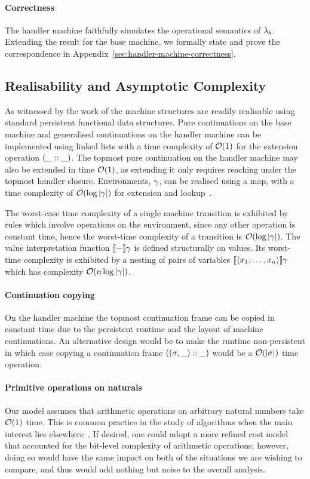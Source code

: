\documentclass[12pt,phd,lfcs,twoside,openright,logo,leftchapter,normalheadings]{infthesis}
\theoremstyle{plain}
\theoremstyle{definition}
\begin{document}
\paragraph{Correctness}
%
The handler machine faithfully simulates the operational semantics of
$\lambda_{\mathsf{h}}$.
%
Extending the result for the base machine, we formally state and prove
the correspondence in
Appendix~\ref{sec:handler-machine-correctness}.

\subsection{Realisability and Asymptotic Complexity}
\label{sec:realisability}
As witnessed by the work of \citet{HillerstromL18} the machine
structures are readily realisable using standard persistent functional
data structures.
%
Pure continuations on the base machine and generalised continuations
on the handler machine can be implemented using linked lists with a
time complexity of $\mathcal{O}(1)$ for the extension operation
$(\_::\_)$.
%
The topmost pure continuation on the handler machine may also be
extended in time $\mathcal{O}(1)$, as extending it only requires reaching
under the topmost handler closure.
%
Environments, $\gamma$, can be realised using a map, with a time
complexity of $\mathcal{O}(\log|\gamma|)$ for extension and
lookup~\citep{Okasaki99}.

The worst-case time complexity of a single machine transition is
exhibited by rules which involve operations on the environment, since
any other operation is constant time, hence the worst-time complexity
of a transition is $\mathcal{O}(\log|\gamma|)$.
%
The value interpretation function $\llbracket - \rrbracket \gamma$ is defined
structurally on values. Its worst-time complexity is exhibited by a
nesting of pairs of variables $\llbracket \langle x_1,\dots,x_n \rangle \rrbracket \gamma$ which
has complexity $\mathcal{O}(n\log|\gamma|)$.

\paragraph{Continuation copying} On the handler machine the topmost
continuation frame can be copied in constant time due to the
persistent runtime and the layout of machine continuations. An
alternative design would be to make the runtime non-persistent
%
in which case copying a continuation frame $((\sigma, \_) ::
\_)$ would be a $\mathcal{O}(|\sigma|)$ time operation.

\paragraph{Primitive operations on naturals}
%
Our model assumes that arithmetic operations on arbitrary natural
numbers take $\mathcal{O}(1)$ time. This is common practice in the study of
algorithms when the main interest lies
elsewhere~\citep[Section~2.2]{CormenLRS09}. If desired, one could
adopt a more refined cost model that accounted for the bit-level
complexity of arithmetic operations; however, doing so would have the
same impact on both of the situations we are wishing to compare, and
thus would add nothing but noise to the overall analysis.
\end{document}
